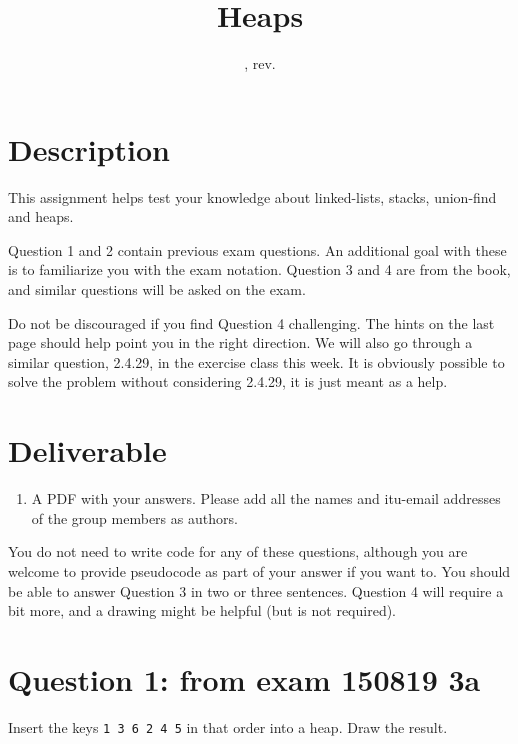 \documentclass{tufte-handout}
\title{Heaps}
\author{}
\date{\GITAuthorDate, rev. \GITAbrHash}
\begin{document}
\maketitle

\section{\textbf{Description}}
  This assignment helps test your knowledge about linked-lists, stacks, union-find and heaps. 
  
  \medskip Question 1 and 2 contain previous exam questions. An additional goal with these is to familiarize you with the exam notation. Question 3 and 4 are from the book, and similar questions will be asked on the exam.
  
  \medskip Do not be discouraged if you find Question 4 challenging. The hints on the last page should help point you in the right direction. We will also go through a similar question, 2.4.29, in the exercise class this week. It is obviously possible to solve the problem without considering 2.4.29, it is just meant as a help.

\section{\textbf{Deliverable}}
\begin{enumerate}
\item A PDF with your answers.
    Please add all the names and itu-email addresses of the group members as authors.
\end{enumerate}

\medskip You do not need to write code for any of these questions, although you are welcome to provide pseudocode as part of your answer if you want to. You should be able to answer Question 3 in two or three sentences. Question 4 will require a bit more, and a drawing might be helpful (but is not required).


\section{\textbf{Question 1}: from exam 150819 3a}
Insert the keys {\tt 1 3 6 2 4 5} in that order into a heap. Draw the result.
\end{document}
